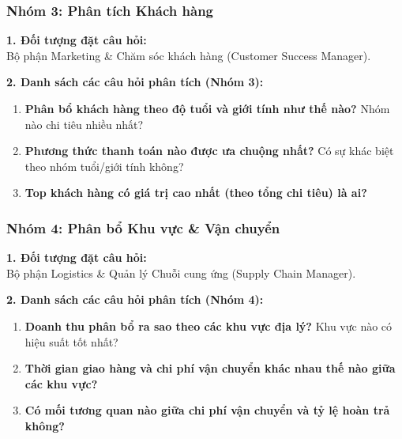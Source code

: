 

\subsubsection{Nhóm 3: Phân tích Khách hàng}
\noindent\textbf{1. Đối tượng đặt câu hỏi:} \\
Bộ phận Marketing \& Chăm sóc khách hàng (Customer Success Manager).

\vspace{0.3cm}
\noindent\textbf{2. Danh sách các câu hỏi phân tích (Nhóm 3):}
\begin{enumerate}[label=(\alph*)]
    \item \textbf{Phân bổ khách hàng theo độ tuổi và giới tính như thế nào?} Nhóm nào chi tiêu nhiều nhất?
    \item \textbf{Phương thức thanh toán nào được ưa chuộng nhất?} Có sự khác biệt theo nhóm tuổi/giới tính không?
    \item \textbf{Top khách hàng có giá trị cao nhất (theo tổng chi tiêu) là ai?}
\end{enumerate}


\newpage
\subsubsection{Nhóm 4: Phân bổ Khu vực \& Vận chuyển}
\noindent\textbf{1. Đối tượng đặt câu hỏi:} \\
Bộ phận Logistics \& Quản lý Chuỗi cung ứng (Supply Chain Manager).

\vspace{0.3cm}
\noindent\textbf{2. Danh sách các câu hỏi phân tích (Nhóm 4):}
\begin{enumerate}[label=(\alph*)]
    \item \textbf{Doanh thu phân bổ ra sao theo các khu vực địa lý?} Khu vực nào có hiệu suất tốt nhất?
    \item \textbf{Thời gian giao hàng và chi phí vận chuyển khác nhau thế nào giữa các khu vực?}
    \item \textbf{Có mối tương quan nào giữa chi phí vận chuyển và tỷ lệ hoàn trả không?}
\end{enumerate}



